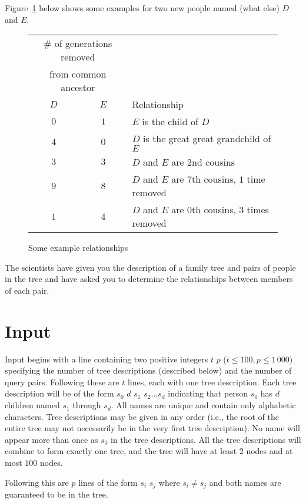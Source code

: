 Figure~\ref{fig:family1} below shows some examples for two new people named (what else) $D$ and $E$.
\begin{figure}[!h]
\centering
\begin{tabular}{|c|c|l|} \hline
\multicolumn{2}{|c|}{\# of generations removed} & \\
\multicolumn{2}{|c|}{from common ancestor} & \\ \cline{1-2}
$D$ & $E$ & Relationship \\ \hline
$0$ & $1$ & $E$ is the child of $D$ \\ \hline
$4$ & $0$ & $D$ is the great great grandchild of $E$ \\ \hline
$3$ & $3$ & $D$ and $E$ are $2$nd cousins \\ \hline
$9$ & $8$ & $D$ and $E$ are $7$th cousins, $1$ time removed \\ \hline
$1$ & $4$ & $D$ and $E$ are $0$th cousins, $3$ times removed \\ \hline
\end{tabular}
\caption{Some example relationships}
\label{fig:family1}
\end{figure}

The scientists have given you the description of a family tree and pairs of people in the tree and have asked you to determine the relationships between members of each pair.

\section*{Input}

Input begins with a line containing two positive integers $t$ $p$ ($t \leq 100, p \leq 1\,000$) specifying the  number of tree descriptions (described below) and the number of query pairs.  Following these are $t$ lines, each with one tree description.  Each tree description will be of the form $s_0$ $d$ $s_1$ $s_2 \ldots s_d$ indicating that person $s_0$ has $d$ children named $s_1$ through $s_d$.  All names are unique and contain only alphabetic characters.  Tree descriptions may be given in any order (i.e., the root of the entire tree may not necessarily be in the very first tree description).  No name will appear more than once as $s_0$ in the tree descriptions.  All the tree descriptions will combine to form exactly one tree, and the tree will have at least $2$ nodes and at most $100$ nodes.

Following this are $p$ lines of the form $s_i$ $s_j$ where $s_i \neq s_j$ and both names are guaranteed to be in the tree.

